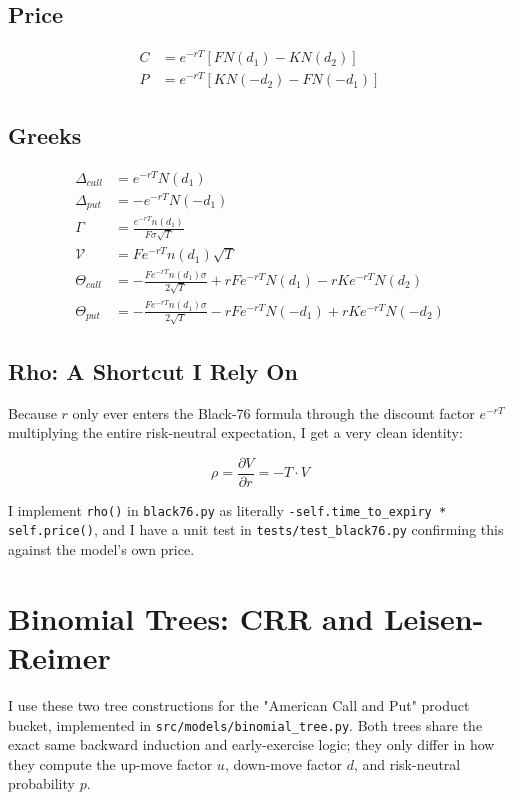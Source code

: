 \documentclass[12pt,a4paper]{article}
\begin{document}
\subsection{Price}

\begin{align}
C &= e^{-rT}\left[F N(d_1) - K N(d_2)\right] \\
P &= e^{-rT}\left[K N(-d_2) - F N(-d_1)\right]
\end{align}

\subsection{Greeks}

\begin{align}
\Delta_{call} &= e^{-rT} N(d_1) \\
\Delta_{put} &= -e^{-rT} N(-d_1) \\
\Gamma &= \frac{e^{-rT} n(d_1)}{F \sigma \sqrt{T}} \\
\mathcal{V} &= F e^{-rT} n(d_1) \sqrt{T} \\
\Theta_{call} &= -\frac{Fe^{-rT}n(d_1)\sigma}{2\sqrt{T}} + rFe^{-rT}N(d_1) - rKe^{-rT}N(d_2) \\
\Theta_{put} &= -\frac{Fe^{-rT}n(d_1)\sigma}{2\sqrt{T}} - rFe^{-rT}N(-d_1) + rKe^{-rT}N(-d_2)
\end{align}

\subsection{Rho: A Shortcut I Rely On}

Because $r$ only ever enters the Black-76 formula through the discount
factor $e^{-rT}$ multiplying the entire risk-neutral expectation, I get a
very clean identity:

\begin{equation}
\rho = \frac{\partial V}{\partial r} = -T \cdot V
\end{equation}

I implement \texttt{rho()} in \texttt{black76.py} as literally
\texttt{-self.time\_to\_expiry * self.price()}, and I have a unit test in
\texttt{tests/test\_black76.py} confirming this against the model's own
price.

\section{Binomial Trees: CRR and Leisen-Reimer}

I use these two tree constructions for the "American Call and Put" product
bucket, implemented in \texttt{src/models/binomial\_tree.py}. Both trees
share the exact same backward induction and early-exercise logic; they only
differ in how they compute the up-move factor $u$, down-move factor $d$,
and risk-neutral probability $p$.
\end{document}
